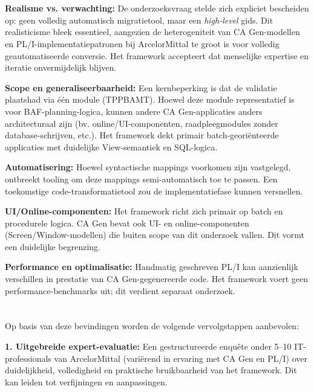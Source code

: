 \section{}%
\label{sec:kritische-reflectie}

\textbf{Realisme vs. verwachting:} De onderzoeksvraag stelde zich expliciet bescheiden op: geen volledig automatisch 
migratietool, maar een \textit{high-level} gids. Dit realisticisme bleek essentieel, aangezien de heterogeniteit 
van CA Gen-modellen en PL/I-implementatiepatronen bij ArcelorMittal te groot is voor volledig geautomatiseerde 
conversie. Het framework accepteert dat menselijke expertise en iteratie onvermijdelijk blijven.

\textbf{Scope en generaliseerbaarheid:} Een kernbeperking is dat de validatie plaatshad via één module (TPPBAMT). 
Hoewel deze module representatief is voor BAF-planning-logica, kunnen andere CA Gen-applicaties anders architecturaal 
zijn (bv. online/UI-componenten, raadpleegmodules zonder database-schrijven, etc.). Het framework dekt primair 
batch-georiënteerde applicaties met duidelijke View-semantiek en SQL-logica.

\textbf{Automatisering:} Hoewel syntactische mappings voorkomen zijn vastgelegd, ontbreekt tooling om deze mappings 
semi-automatisch toe te passen. Een toekomstige code-transformatietool zou de implementatiefase kunnen versnellen.

\textbf{UI/Online-componenten:} Het framework richt zich primair op batch en procedurele logica. CA Gen 
bevat ook UI- en online-componenten (Screen/Window-modellen) die buiten scope van dit onderzoek vallen. 
Dit vormt een duidelijke begrenzing.

\textbf{Performance en optimalisatie:} Handmatig geschreven PL/I kan aanzienlijk verschillen in prestatie van 
CA Gen-gegenereerde code. Het framework voert geen performance-benchmarks uit; dit verdient separaat onderzoek.

\section{}%
\label{sec:toekomstig-onderzoek}

Op basis van deze bevindingen worden de volgende vervolgstappen aanbevolen:

\textbf{1. Uitgebreide expert-evaluatie:} Een gestructureerde enquête onder 5--10 IT-professionals van ArcelorMittal 
(variërend in ervaring met CA Gen en PL/I) over duidelijkheid, volledigheid en praktische bruikbaarheid van het 
framework. Dit kan leiden tot verfijningen en aanpassingen.

